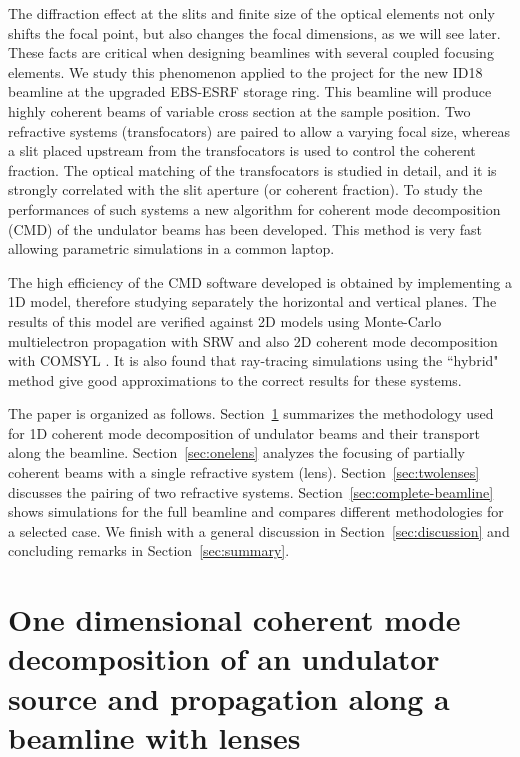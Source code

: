 \documentclass{iucr}              %
\begin{document}
The diffraction effect at the slits and finite size of the optical elements not only shifts the focal point, but also changes the focal dimensions, as we will see later. These facts are critical when designing beamlines with several coupled focusing elements. We study this phenomenon applied to the project for the new ID18 beamline at the upgraded EBS-ESRF storage ring. This beamline will produce highly coherent beams of variable cross section at the sample position. Two refractive systems (transfocators) are paired to allow a varying focal size, whereas a slit placed upstream from the transfocators is used to control the coherent fraction. The optical matching of the transfocators is studied in detail, and it is strongly correlated with the slit aperture (or coherent fraction). To study the performances of such systems a new algorithm for coherent mode decomposition (CMD) of the undulator beams has been developed. This method is very fast allowing parametric simulations in a common laptop.

The high efficiency of the CMD software developed is obtained by implementing a 1D model, therefore studying separately the horizontal and vertical planes. The results of this model are verified against 2D models using Monte-Carlo multielectron propagation with SRW and also 2D coherent mode decomposition with COMSYL \cite{codeCOMSYL}. It is also found that ray-tracing simulations using the ``hybrid" method \cite{codeHYBRID} give good approximations to the correct results for these systems. 

The paper is organized as follows. Section~\ref{sec:theory} summarizes the methodology used for 1D coherent mode decomposition of undulator beams and their transport along the beamline. Section~\ref{sec:onelens} analyzes the focusing of partially coherent beams with a single refractive system (lens). Section~\ref{sec:twolenses} discusses the pairing of two refractive systems. Section~\ref{sec:complete-beamline} shows simulations for the full beamline and compares different methodologies for a selected case. We finish with a general discussion in Section~\ref{sec:discussion} and  concluding remarks in Section~\ref{sec:summary}. 


\section{One dimensional coherent mode decomposition of an undulator source and propagation along a beamline with lenses}\label{sec:theory}
\end{document}
